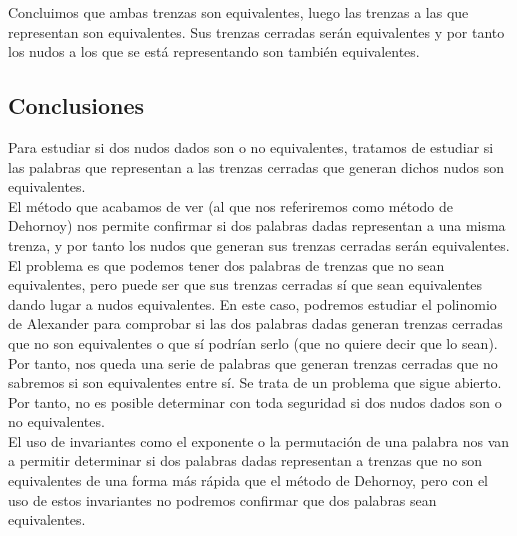 \documentclass[14pt]{extarticle}
\begin{document}
Concluimos que ambas trenzas son equivalentes, luego las trenzas a las que representan son equivalentes. Sus trenzas cerradas serán equivalentes y por tanto los nudos a los que se está representando son también equivalentes.\\

\newpage
\subsection{Conclusiones}
Para estudiar si dos nudos dados son o no equivalentes, tratamos de estudiar si las palabras que representan a las trenzas cerradas que generan dichos nudos son equivalentes. \\

El método que acabamos de ver (al que nos referiremos como método de Dehornoy) nos permite confirmar si dos palabras dadas representan a una misma trenza, y por tanto los nudos que generan sus trenzas cerradas serán equivalentes.\\

El problema es que podemos tener dos palabras de trenzas que no sean equivalentes, pero puede ser que sus trenzas cerradas sí que sean equivalentes dando lugar a nudos equivalentes. En este caso, podremos estudiar el polinomio de Alexander para comprobar si las dos palabras dadas generan trenzas cerradas que no son equivalentes o que sí podrían serlo (que no quiere decir que lo sean).\\

Por tanto, nos queda una serie de palabras que generan trenzas cerradas que no sabremos si son equivalentes entre sí. Se trata de un problema que sigue abierto. Por tanto, no es posible determinar con toda seguridad si dos nudos dados son o no equivalentes. \\

El uso de invariantes como el exponente o la permutación de una palabra nos van a permitir determinar si dos palabras dadas representan a trenzas que no son equivalentes de una forma más rápida que el método de Dehornoy, pero con el uso de estos invariantes no podremos confirmar que dos palabras sean equivalentes.\\ 
\end{document}
